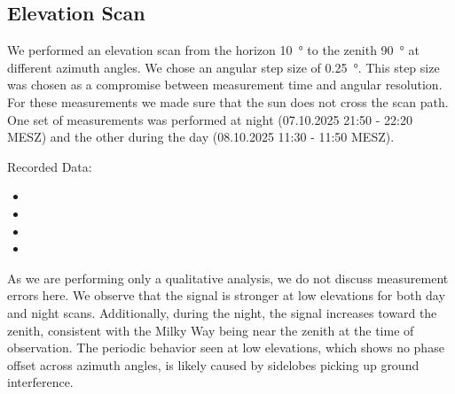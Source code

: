 \subsection{Elevation Scan}
We performed an elevation scan from the horizon \SI{10}{\degree} to the zenith \SI{90}{\degree} at different  azimuth angles.
We chose an angular step size of \SI{0.25}{\degree}. This step size was chosen as a compromise between measurement time and angular resolution.
For these measurements we made sure that the sun does not cross the scan path.
One set of measurements was performed at night (07.10.2025 21:50 - 22:20 MESZ) and the other during the day (08.10.2025 11:30 - 11:50 MESZ).

Recorded Data:

\begin{itemize}
    \item {}
    \item {}
    \item {}
    \item {}
\end{itemize}

As we are performing only a qualitative analysis, we do not discuss measurement errors here. We observe that the signal is stronger at low elevations for both day and night scans. Additionally, during the night, the signal increases toward the zenith, consistent with the Milky Way being near the zenith at the time of observation.
The periodic behavior seen at low elevations, which shows no phase offset across azimuth angles, is likely caused by sidelobes picking up ground interference.

